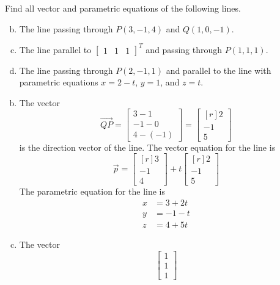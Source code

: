 \documentclass[../main.tex]{subfiles}
\begin{document}
Find all vector and parametric equations of the following lines.
\begin{enumerate}[a)]
	\setcounter{enumi}{1}
	\item The line passing through $P(3, -1, 4)$ and $Q(1, 0, -1)$.
	\setcounter{enumi}{3}
	\item The line parallel to $\begin{bmatrix}1&1&1\end{bmatrix}^T$ and passing through $P(1, 1, 1)$.
	\setcounter{enumi}{5}
	\item The line passing through $P(2, -1, 1)$ and parallel to the line with parametric equations $x = 2 - t$, $y = 1$, and $z = t$.
\end{enumerate}

\solution
\begin{enumerate}[a)]
	\setcounter{enumi}{1}
	\item The vector
	\[ \overrightarrow{QP} = \begin{bmatrix}
					3-1\\
					-1-0\\
					4-(-1)
				 \end{bmatrix}
				   = \begin{bmatrix*}[r]
			       		2\\
					-1\\
					5
				 \end{bmatrix*} \]
		is the direction vector of the line.
		The vector equation for the line is
		\[ \vec{p} = \begin{bmatrix*}[r]
					3\\
					-1\\
					4
			     \end{bmatrix*}
				 + t \begin{bmatrix*}[r]
			     2\\
			     -1\\
			     5
			     \end{bmatrix*} \]
		The parametric equation for the line is
			   \begin{align*}
			   	x &= 3+2t\\
				y &= -1-t\\
				z &= 4+5t
			   \end{align*}
	\setcounter{enumi}{3}
	\item The vector
		\[ \begin{bmatrix}1\\1\\1\end{bmatrix} \]

\end{enumerate}
\end{document}
